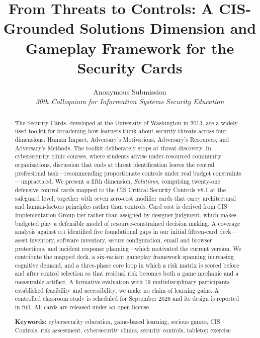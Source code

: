 \documentclass[10pt,twocolumn,letterpaper]{article}
\title{\vspace{-1.5em}\bfseries From Threats to Controls: A CIS-Grounded
Solutions Dimension and Gameplay Framework for the Security Cards}
\author{\normalsize Anonymous Submission\\
\normalsize \textit{30th Colloquium for Information Systems Security Education}}
\date{}
\newcommand{\ig}[1]{\textsc{ig#1}}
\begin{document}
\maketitle

\begin{abstract}
\noindent\small
The Security Cards, developed at the University of Washington in 2013, are a
widely used toolkit for broadening how learners think about security threats
across four dimensions: Human Impact, Adversary's Motivations, Adversary's
Resources, and Adversary's Methods. The toolkit deliberately stops at threat
discovery. In cybersecurity clinic courses, where students advise
under-resourced community organizations, discussion that ends at threat
identification leaves the central professional task---recommending
proportionate controls under real budget constraints---unpracticed. We present
a fifth dimension, \emph{Solutions}, comprising twenty-one defensive control
cards mapped to the CIS Critical Security Controls v8.1 at the safeguard level,
together with seven zero-cost modifier cards that carry architectural and
human-factors principles rather than controls. Card cost is
derived from CIS Implementation Group tier rather than assigned by designer
judgment, which makes budgeted play a defensible model of resource-constrained
decision making. A coverage analysis against \ig{1} identified five foundational
gaps in our initial fifteen-card deck---asset inventory, software inventory,
secure configuration, email and browser protections, and incident response
planning---which motivated the current version. We contribute the mapped deck,
a six-variant gameplay framework spanning increasing cognitive demand, and a
three-phase core loop in which a risk matrix is scored before and after control
selection so that residual risk becomes both a game mechanic and a measurable
artifact. A formative evaluation with 19 multidisciplinary participants
established feasibility and accessibility; we make no claim of learning gains.
A controlled classroom study is scheduled for September 2026 and its design is
reported in full. All cards are released under an open license.

\vspace{0.6em}
\noindent\textbf{Keywords:} cybersecurity education, game-based learning,
serious games, CIS Controls, risk assessment, cybersecurity clinics,
security controls, tabletop exercise
\end{abstract}
\end{document}

